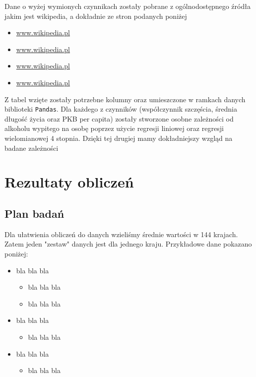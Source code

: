 \documentclass[10pt]{article}
\begin{document}
Dane o wyżej wymionych czynnikach zostały pobrane z ogólnodostępnego źródła jakim jest wikipedia, a dokładnie ze stron podanych poniżej
\begin{itemize}
    \item \url{www.wikipedia.pl}
    \item \url{www.wikipedia.pl}
    \item \url{www.wikipedia.pl}
    \item \url{www.wikipedia.pl}
\end{itemize}
Z tabel wzięte zostały potrzebne kolumny oraz umieszczone w ramkach danych biblioteki \texttt{Pandas}.
Dla każdego z czynników (współczynnik szczęścia, średnia długość życia oraz PKB per capita) zostały stworzone osobne zależności od alkoholu wypitego na osobę poprzez użycie regresji liniowej oraz regresji wielomianowej 4 stopnia.
Dzięki tej drugiej mamy dokładniejszy wzgląd na badane zależności
\section{Rezultaty obliczeń}

\subsection{Plan badań}
Dla ułatwienia obliczeń do danych wzieliśmy średnie wartości w 144 krajach.
Zatem jeden "zestaw" danych jest dla jednego kraju.
Przykładowe dane pokazano poniżej:

\begin{itemize}
    \item bla bla bla
    \begin{itemize}
        \item bla bla bla
        \item bla bla bla
    \end{itemize}
    \item bla bla bla
    \begin{itemize}
        \item bla bla bla
    \end{itemize}
    \item bla bla bla
    \begin{itemize}
        \item bla bla bla
    \end{itemize}
\end{itemize}
\end{document}
